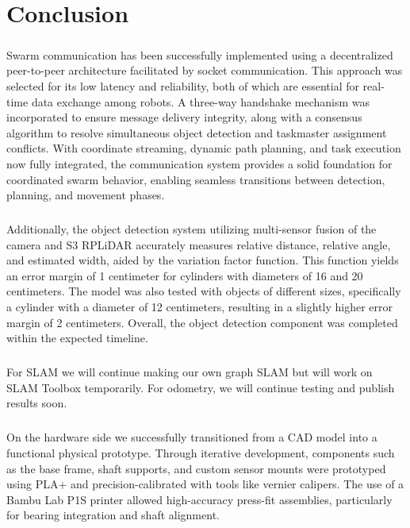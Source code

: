 \chapter{Conclusion}

\paragraph*{}
Swarm communication has been successfully implemented using a decentralized peer-to-peer architecture facilitated by socket communication. This approach was selected for its low latency and reliability, both of which are essential for real-time data exchange among robots. A three-way handshake mechanism was incorporated to ensure message delivery integrity, along with a consensus algorithm to resolve simultaneous object detection and taskmaster assignment conflicts. With coordinate streaming, dynamic path planning, and task execution now fully integrated, the communication system provides a solid foundation for coordinated swarm behavior, enabling seamless transitions between detection, planning, and movement phases.

\paragraph*{}
Additionally, the object detection system utilizing multi-sensor fusion of the camera and S3 RPLiDAR accurately measures relative distance, relative angle, and estimated width, aided by the variation factor function. This function yields an error margin of 1 centimeter for cylinders with diameters of 16 and 20 centimeters. The model was also tested with objects of different sizes, specifically a cylinder with a diameter of 12 centimeters, resulting in a slightly higher error margin of 2 centimeters. Overall, the object detection component was completed within the expected timeline.

\paragraph*{}
For SLAM we will continue making our own graph SLAM but will work on SLAM Toolbox temporarily. For odometry, we will continue testing and publish results soon.

\paragraph*{}
On the hardware side we successfully transitioned from a CAD model into a functional physical prototype. Through iterative development, components such as the base frame, shaft supports, and custom sensor mounts were prototyped using PLA+ and precision-calibrated with tools like vernier calipers. The use of a Bambu Lab P1S printer allowed high-accuracy press-fit assemblies, particularly for bearing integration and shaft alignment.


